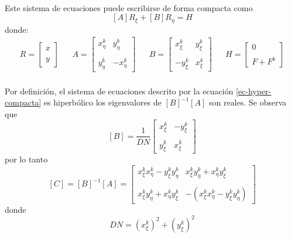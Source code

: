 \documentclass[letterpaper, openright, 12pt]{book}
\begin{document}
		\paragraph*{}
			Este sistema de ecuaciones puede escribirse de forma compacta como
			\begin{equation}
				\left[A \right] R_{\xi} + \left[ B \right] R_{\eta} = H
				\label{ec-hyper-compacta}
			\end{equation}
			donde:
			\begin{align*}
				R = \begin{bmatrix}
				 x \\ \\
				 y
				\end{bmatrix}&&
				A = \begin{bmatrix}
					x_{\eta}^{k} & y_{\eta}^{k} \\ \\
					y_{\eta}^{k} & -x_{\eta}^{k}
				\end{bmatrix}&&
				B = \begin{bmatrix}
					x_{\xi}^{k} & y_{\xi}^{k} \\ \\
					-y_{\xi}^{k} & x_{\xi}^{k}
				\end{bmatrix}&&
				H = \begin{bmatrix}
					0 \\ \\
					F + F^{k}
				\end{bmatrix}
			\end{align*}
		
		\paragraph*{}
			Por definición, el sistema de ecuaciones descrito por la ecuación \ref{ec-hyper-compacta} es hiperbólico los eigenvalores de $\left[ B \right]^{-1} \left[ A \right]$ son reales. Se observa que\\
			\begin{equation*}
				\left[ B \right] = \frac{1}{DN}\begin{bmatrix}
					x_{\xi}^{k} & -y_{\xi}^{k} \\ \\
					y_{\xi}^{k} & x_{\xi}^{k}
				\end{bmatrix}
			\end{equation*}
			por lo tanto
			\begin{equation*}
				\left[ C \right] = \left[ B \right]^{-1} \left[ A \right] = \begin{bmatrix}
					x_{\xi}^{k} x_{\eta}^{k} - y_{\xi}^{k} y_{\eta}^{k} &
					x_{\xi}^{k} y_{\eta}^{k} + x_{\eta}^{k} y_{\xi}^{k} \\ \\
					x_{\xi}^{k} y_{\eta}^{k} + x_{\eta}^{k} y_{\xi}^{k} &
					- \left( x_{\xi}^{k} x_{\eta}^{k} - y_{\xi}^{k} y_{\eta}^{k} \right)
				\end{bmatrix}
			\end{equation*}
			donde
			\begin{equation*}
				DN = \left( x_{\xi}^{k} \right)^2 + \left( y_{\xi}^{k} \right)^2
			\end{equation*}
		
\end{document}
